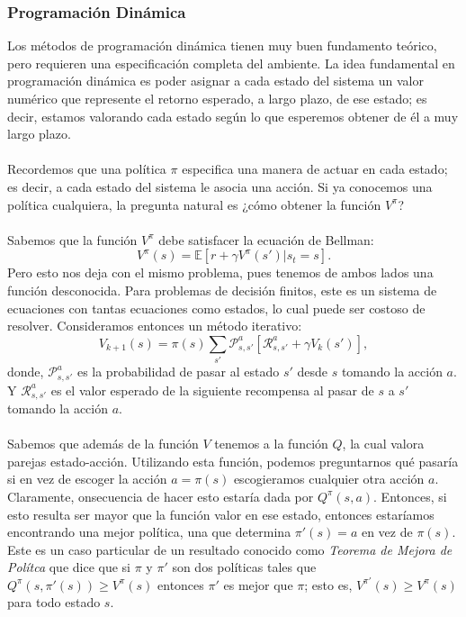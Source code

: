 \documentclass[11pt]{article}
\theoremstyle{plain}
\begin{document}
\subsubsection{Programación Dinámica}
Los métodos de programación dinámica tienen muy buen fundamento teórico, pero requieren una especificación completa del ambiente. La idea fundamental en programación dinámica es poder asignar a cada estado del sistema un valor numérico que represente el retorno esperado, a largo plazo, de ese estado; es decir, estamos valorando cada estado según lo que esperemos obtener de él a muy largo plazo. \\
\\
Recordemos que una política $\pi$ especifica una manera de actuar en cada estado; es decir, a cada estado del sistema le asocia una acción. Si ya conocemos una política cualquiera, la pregunta natural es ¿cómo obtener la función $V^\pi$?\\
\\
Sabemos que la función $V^\pi$ debe satisfacer la ecuación de Bellman:
\[ V^\pi (s) = \mathbb{E}[r + \gamma V^\pi (s') | s_t = s]. \]
Pero esto nos deja con el mismo problema, pues tenemos de ambos lados una función desconocida. Para problemas de decisión finitos, este es un sistema de ecuaciones con tantas ecuaciones como estados, lo cual puede ser costoso de resolver. Consideramos entonces un método iterativo: 
 \[ V_{k+1} (s) = \pi(s) \sum_{s'} \mathcal{P}_{s,s'}^a [ \mathcal{R}_{s,s'}^a + \gamma V_k(s')], \]
donde, $\mathcal{P}_{s,s'}^a$  es la probabilidad de pasar al estado $s'$ desde $s$ tomando la acción $a$. Y $\mathcal{R}_{s,s'}^a$ es el valor esperado de la siguiente recompensa al pasar de $s$ a $s'$ tomando la acción $a$.\\
\\
Sabemos que además de la función $V$ tenemos a la función $Q$, la cual valora parejas estado-acción. Utilizando esta función, podemos preguntarnos qué pasaría si en vez de escoger la acción $a=\pi(s)$ escogieramos cualquier otra acción $a$. Claramente, onsecuencia de hacer esto estaría dada por $Q^{\pi}(s,a)$. Entonces, si esto resulta ser mayor que la función valor en ese estado, entonces estaríamos encontrando una mejor política, una que determina $\pi'(s)=a$ en vez de $\pi(s)$. Este es un caso particular de un resultado conocido como \textit{Teorema de Mejora de Polítca} que dice que si $\pi$ y $\pi'$ son dos políticas tales que $Q^{\pi} (s, \pi'(s)) \geq V^{\pi}(s)$ entonces $\pi'$ es mejor que $\pi$; esto es, $V^{\pi'} (s) \geq V^{\pi}(s)$ para todo estado $s$.\\
\end{document}
